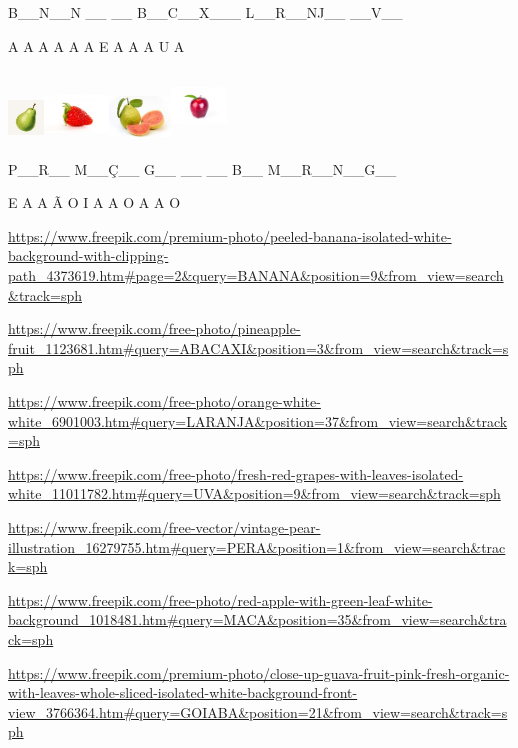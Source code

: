 {{B\_\_N\_\_N \_\_ \_\_ B\_\_C\_\_X\_\_\_ L\_\_R\_\_NJ\_\_ \_\_V\_\_

A A A A A A E A A A U A

\includegraphics[width=0.37580in,height=0.49340in]{media/image73.jpeg}\includegraphics[width=0.67500in,height=0.56111in]{media/image74.jpeg}\includegraphics[width=0.64462in,height=0.50955in]{media/image75.jpeg}\includegraphics[width=0.58584in,height=0.73807in]{media/image76.jpeg}

P\_\_R\_\_ M\_\_Ç\_\_ G\_\_ \_\_ \_\_ B\_\_ M\_\_R\_\_N\_\_G\_\_

E A A Ã O I A A O A A O

\url{https://www.freepik.com/premium-photo/peeled-banana-isolated-white-background-with-clipping-path_4373619.htm\#page=2\&query=BANANA\&position=9\&from_view=search\&track=sph}

\url{https://www.freepik.com/free-photo/pineapple-fruit_1123681.htm\#query=ABACAXI\&position=3\&from_view=search\&track=sph}

\url{https://www.freepik.com/free-photo/orange-white-white_6901003.htm\#query=LARANJA\&position=37\&from_view=search\&track=sph}

\url{https://www.freepik.com/free-photo/fresh-red-grapes-with-leaves-isolated-white_11011782.htm\#query=UVA\&position=9\&from_view=search\&track=sph}

\url{https://www.freepik.com/free-vector/vintage-pear-illustration_16279755.htm\#query=PERA\&position=1\&from_view=search\&track=sph}

\url{https://www.freepik.com/free-photo/red-apple-with-green-leaf-white-background_1018481.htm\#query=MACA\&position=35\&from_view=search\&track=sph}

\url{https://www.freepik.com/premium-photo/close-up-guava-fruit-pink-fresh-organic-with-leaves-whole-sliced-isolated-white-background-front-view_3766364.htm\#query=GOIABA\&position=21\&from_view=search\&track=sph}

}}
